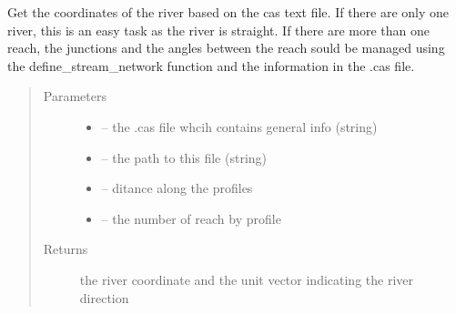 \documentclass[letterpaper,10pt,english]{sphinxmanual}
\begin{document}

\begin{fulllineitems}
\label{\detokenize{index:src.mascaret.river_coord_non_georef_from_cas}}
Get the coordinates of the river based on the cas text file. If there are only one river, this is an easy task as
the river is straight. If there are more than one reach, the junctions and the angles between the reach sould be
managed using the define\_stream\_network function and the information in the .cas file.
\begin{quote}\begin{description}
\item[{Parameters}] \leavevmode\begin{itemize}
\item {} 
 -- the .cas file whcih contains general info (string)

\item {} 
 -- the path to this file (string)

\item {} 
 -- ditance along the profiles

\item {} 
 -- the number of reach by profile

\end{itemize}

\item[{Returns}] \leavevmode
the river coordinate and the unit vector indicating the river direction

\end{description}\end{quote}

\end{fulllineitems}

\end{document}
